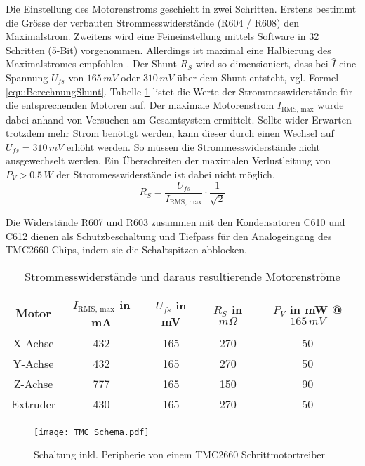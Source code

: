 Die Einstellung des Motorenstroms geschieht in zwei Schritten. Erstens bestimmt die Grösse der verbauten Strommesswiderstände (R604 / R608) den Maximalstrom. Zweitens wird eine Feineinstellung mittels Software in 32 Schritten (5-Bit) vorgenommen. Allerdings ist maximal eine Halbierung des Maximalstromes empfohlen \cite{TMC2660}. Der Shunt $R_S$ wird so dimensioniert, dass bei $\hat{I}$ eine Spannung $U_{fs}$ von $165\,\si{mV}$ oder $310\,\si{mV}$ über dem Shunt entsteht, vgl. Formel \eqref{equ:BerechnungShunt}. Tabelle \ref{tab:Shuntwiderstaende} listet die Werte der Strommesswiderstände für die entsprechenden Motoren auf. Der maximale Motorenstrom $I_{\text{RMS, max}}$ wurde dabei anhand von Versuchen am Gesamtsystem ermittelt. Sollte wider Erwarten trotzdem mehr Strom benötigt werden, kann dieser durch einen Wechsel auf $U_{fs} = 310\,\si{mV}$ erhöht werden. So müssen die Strommesswiderstände nicht ausgewechselt werden. Ein Überschreiten der maximalen Verlustleitung von $P_V > 0.5\,\si{W}$ der Strommesswiderstände ist dabei nicht möglich.\\

\begin{equation}
	R_S = \frac{U_{fs}}{I_{\text{RMS, max}}} \cdot \frac{1}{\sqrt{2}} 
	\label{equ:BerechnungShunt}
\end{equation}

Die Widerstände R607 und R603 zusammen mit den Kondensatoren C610 und C612 dienen als Schutzbeschaltung und Tiefpass für den Analogeingang des TMC2660 Chips, indem sie die Schaltspitzen abblocken.

\begin{table}[h]
	\small
	\begin{center}
	\def\arraystretch{1.3} \tabcolsep=14pt
		\begin{tabular}{|c|c|c|c|c|}
			\hline
			Motor & $I_{\text{RMS, max}}$ in mA & $U_{fs}$ in mV & $R_S$ in $\si{m\Omega}$ & $P_V$ in mW @ $165\,\si{mV}$  \\ \hline
			X-Achse & 432 & 165 & 270  & 50\\ \hline
			Y-Achse & 432 & 165 & 270  & 50\\ \hline
			Z-Achse & 777 & 165 & 150  & 90\\ \hline
			Extruder & 430 & 165 & 270  &50 \\ \hline
		\end{tabular} 
	\end{center}
	\caption{Strommesswiderstände und daraus resultierende Motorenströme }
	\label{tab:Shuntwiderstaende}
\end{table}
 
 \vspace{10mm}
\begin{figure}[h]
	\centering
	\texttt{[image: TMC\_Schema.pdf]}
	\caption{Schaltung inkl. Peripherie von einem TMC2660 Schrittmotortreiber}
	\label{pic:Schema_TMC}
\end{figure}
